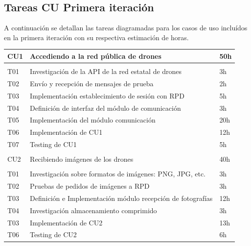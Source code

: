 \subsection{Tareas CU Primera iteración}

A continuación se detallan las tareas diagramadas para los casos de uso incluídos en la primera iteración con su respectiva estimación de horas.

\begin{table}[h!]
    \begin{tabular}{lll}
	\hline
	CU1 & Accediendo a la red pública de drones & 50h \\
	\hline \\
	T01 & Investigación de la API  de la red estatal de drones & 3h \\
	T02 & Envío y recepción de mensajes de prueba & 2h \\
	T03 & Implementación establecimiento de sesión con RPD & 5h \\
	T04 & Definición de interfaz del módulo de comunicación & 3h \\
	T05 & Implementación del módulo comunicación & 20h \\
	T06 & Implementación de CU1 & 12h \\
	T07 & Testing de CU1 & 5h \\
	\hline \\
	\hline
	CU2 &  Recibiendo imágenes de los drones & 40h \\
	\hline \\
	T01 & Investigación sobre formatos de imágenes: PNG, JPG, etc. & 3h \\
	T02 & Pruebas de pedidos de imágenes a RPD & 3h \\
	T03 & Definición e Implementación módulo recepción de fotografías & 12h \\
	T04 & Investigación almacenamiento comprimido & 3h \\
	T03 & Implementación de CU2 & 13h \\
	T06 & Testing de CU2 & 6h \\
	\hline
    \end{tabular}
\end{table}

\clearpage

